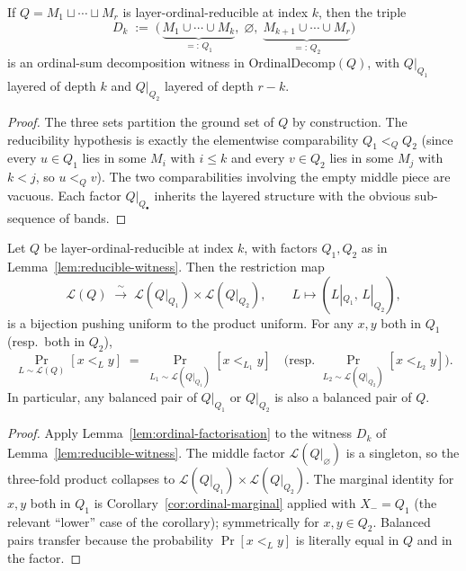 \begin{lemma}
\label{lem:reducible-witness}
If $Q = M_1 \sqcup \cdots \sqcup M_r$ is layer-ordinal-reducible at
index $k$, then the triple
\[
  D_k \;:=\; \bigl(\,
    \underbrace{M_1 \cup \cdots \cup M_k}_{=:\,Q_1},\;
    \varnothing,\;
    \underbrace{M_{k+1} \cup \cdots \cup M_r}_{=:\,Q_2}
  \bigr)
\]
is an ordinal-sum decomposition witness in
$\mathrm{OrdinalDecomp}(Q)$, with $Q|_{Q_1}$ layered of depth $k$ and
$Q|_{Q_2}$ layered of depth $r - k$.
\end{lemma}

\begin{proof}
The three sets partition the ground set of $Q$ by construction. The
reducibility hypothesis is exactly the elementwise comparability
$Q_1 <_Q Q_2$ (since every $u \in Q_1$ lies in some $M_i$ with
$i \le k$ and every $v \in Q_2$ lies in some $M_j$ with $k < j$, so
$u <_Q v$). The two comparabilities involving the empty middle piece
are vacuous. Each factor $Q|_{Q_\bullet}$ inherits the layered
structure with the obvious sub-sequence of bands.
\end{proof}

\begin{corollary}
\label{cor:reducibility-transfer}
Let $Q$ be layer-ordinal-reducible at index $k$, with factors
$Q_1, Q_2$ as in Lemma~\ref{lem:reducible-witness}. Then the
restriction map
\[
  \mathcal L(Q) \;\xrightarrow{\;\sim\;}\;
  \mathcal L(Q|_{Q_1}) \times \mathcal L(Q|_{Q_2}),
  \qquad L \mapsto (L|_{Q_1},\,L|_{Q_2}),
\]
is a bijection pushing uniform to the product uniform. For any
$x, y$ both in $Q_1$ (resp.\ both in $Q_2$),
\[
  \Pr_{L \sim \mathcal L(Q)}[x <_L y]
  \;=\;
  \Pr_{L_1 \sim \mathcal L(Q|_{Q_1})}[x <_{L_1} y]
  \quad\bigl(\text{resp.\ }
  \Pr_{L_2 \sim \mathcal L(Q|_{Q_2})}[x <_{L_2} y]\bigr).
\]
In particular, any balanced pair of $Q|_{Q_1}$ or $Q|_{Q_2}$ is also
a balanced pair of $Q$.
\end{corollary}

\begin{proof}
Apply Lemma~\ref{lem:ordinal-factorisation} to the witness $D_k$ of
Lemma~\ref{lem:reducible-witness}. The middle factor $\mathcal
L(Q|_{\varnothing})$ is a singleton, so the three-fold product
collapses to $\mathcal L(Q|_{Q_1}) \times \mathcal L(Q|_{Q_2})$. The
marginal identity for $x, y$ both in $Q_1$ is
Corollary~\ref{cor:ordinal-marginal} applied with $X_- = Q_1$ (the
relevant ``lower'' case of the corollary); symmetrically for
$x, y \in Q_2$. Balanced pairs transfer because the probability
$\Pr[x <_L y]$ is literally equal in $Q$ and in the factor.
\end{proof}

